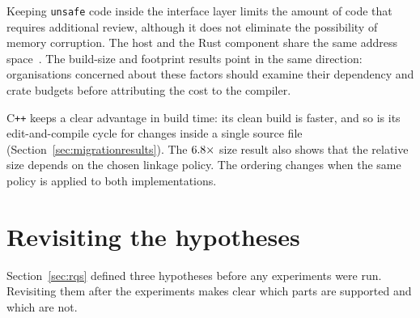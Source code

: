 \documentclass[english,oneside,a4paper,censored,csm,software-track-2020]{HYthesisML}
\begin{document}
Keeping \texttt{unsafe} code inside the interface layer limits the amount of
code that requires additional review, although it does not eliminate the
possibility of memory corruption. The host and the Rust component share the
same address space~\cite{rivera2021galeed,kirth2022pkrusafe}. The build-size
and footprint results point in the same direction: organisations concerned about
these factors should examine their dependency and crate budgets before
attributing the cost to the compiler.

C\texttt{++} keeps a clear advantage in build time: its clean build is faster, and so is its
edit-and-compile cycle for changes inside a single source file
(Section~\ref{sec:migrationresults}). The
$6.8\times$ size result also shows that the relative size depends
on the chosen linkage policy. The ordering changes when the same policy is
applied to both implementations.

\section{Revisiting the hypotheses}\label{sec:hypotheses}
Section~\ref{sec:rqs} defined three hypotheses before any experiments were run.
Revisiting them after the experiments makes clear which parts are supported and
which are not.
\end{document}
